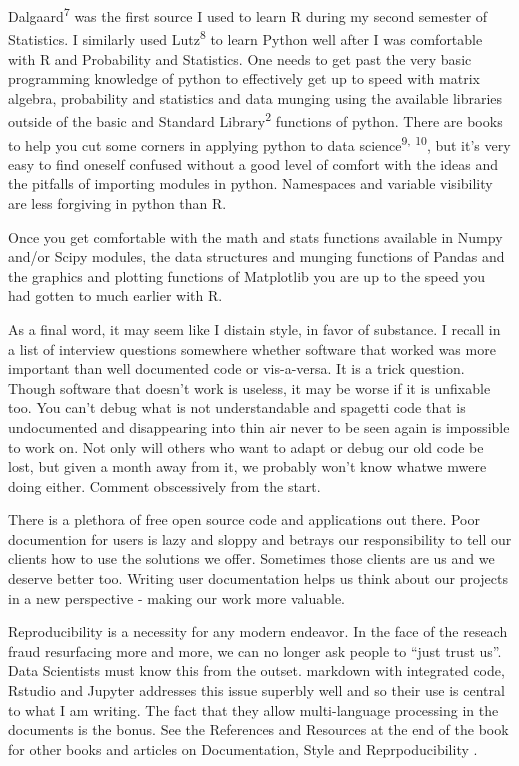 \documentclass[]{book}
\theoremstyle{definition}
\theoremstyle{definition}
\theoremstyle{definition}
\theoremstyle{remark}
\begin{document}
Dalgaard\textsuperscript{7}  was the first source I used
to learn R during my second semester of Statistics. I similarly used
Lutz\textsuperscript{8}  to learn Python well after I was
comfortable with R and Probability and Statistics. One needs to get past
the very basic programming knowledge of python to effectively get up to
speed with matrix algebra, probability and statistics and data munging
using the available libraries outside of the basic and Standard
Library\textsuperscript{2}  functions of python.
There are books to help you cut some corners in applying python to data
science\textsuperscript{9,} \textsuperscript{10}, but it's very easy to
find oneself confused without a good level of comfort with the ideas and
the pitfalls of importing modules in python. Namespaces
 and variable visibility are less forgiving in python
than R.

Once you get comfortable with the math and stats functions available in
Numpy  and/or  Scipy modules, the data
structures and munging functions of Pandas  and the
graphics and plotting functions of  Matplotlib you are
up to the speed you had gotten to much earlier with R.

As a final word, it may seem like I distain style, in favor of
substance. I recall in a list of interview questions somewhere whether
software that worked was more important than well documented code or
vis-a-versa. It is a trick question. Though software that doesn't work
is useless, it may be worse if it is unfixable too. You can't debug what
is not understandable and spagetti code that is undocumented and
disappearing into thin air never to be seen again is impossible to work
on. Not only will others who want to adapt or debug our old code be
lost, but given a month away from it, we probably won't know whatwe
mwere doing either. Comment obscessively from the start.

There is a plethora of free open source code and applications out there.
Poor documention for users is lazy and sloppy and betrays our
responsibility to tell our clients how to use the solutions we offer.
Sometimes those clients are us and we deserve better too. Writing user
documentation helps us think about our projects in a new perspective -
making our work more valuable.

Reproducibility is a necessity for any modern endeavor. In the face of
the reseach fraud resurfacing more and more, we can no longer ask people
to ``just trust us''. Data Scientists must know this from the outset.
markdown with integrated code, Rstudio and Jupyter addresses this issue
superbly well and so their use is central to what I am writing. The fact
that they allow multi-language processing in the documents is the bonus.
See the References and Resources at the end of the book for other books
and articles on Documentation, Style and Reprpoducibility
.
\end{document}
